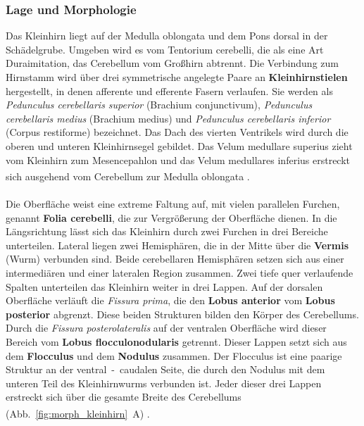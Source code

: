 \subsubsection{Lage und Morphologie}
Das Kleinhirn liegt auf der Medulla oblongata und dem Pons dorsal in der Schädelgrube. Umgeben wird es vom Tentorium cerebelli, die als eine Art Duraimitation, das Cerebellum vom Großhirn abtrennt. Die Verbindung zum Hirnstamm wird über drei symmetrische angelegte Paare an \textbf{Kleinhirnstielen}  hergestellt, in denen afferente und efferente Fasern verlaufen. Sie werden als \textit{Pedunculus cerebellaris superior} (Brachium conjunctivum), \textit{Pedunculus cerebellaris medius} (Brachium medius)  und \textit{Pedunculus cerebellaris inferior} (Corpus restiforme)  bezeichnet.  Das Dach des vierten Ventrikels wird durch die oberen und unteren Kleinhirnsegel  gebildet. Das Velum medullare superius zieht vom Kleinhirn zum Mesencepahlon und das Velum medullares inferius erstreckt sich ausgehend vom Cerebellum zur Medulla oblongata \textsuperscript{\cite[Kap.~7]{trepel2011neuroanatomie}}. \\
\\ \noindent Die Oberfläche weist eine extreme Faltung auf, mit vielen parallelen Furchen, genannt \textbf{Folia cerebelli}, die zur Vergrößerung der Oberfläche dienen. In die Längsrichtung lässt sich das Kleinhirn durch zwei Furchen in drei Bereiche unterteilen. Lateral liegen zwei Hemisphären, die in der Mitte über die \textbf{Vermis} (Wurm)  verbunden sind. Beide cerebellaren Hemisphären setzen sich aus einer intermediären und einer lateralen Region zusammen. Zwei tiefe quer verlaufende Spalten unterteilen das Kleinhirn weiter in drei Lappen. Auf der dorsalen Oberfläche verläuft die \textit{Fissura prima}, die den \textbf{Lobus anterior} vom \textbf{Lobus posterior} abgrenzt. Diese beiden Strukturen bilden den Körper des Cerebellums. Durch die \textit{Fissura posterolateralis} auf der ventralen Oberfläche wird dieser Bereich vom \textbf{Lobus flocculonodularis} getrennt. Dieser Lappen setzt sich aus dem \textbf{Flocculus}  und dem \textbf{Nodulus}  zusammen. Der Flocculus ist eine paarige Struktur an der ventral~-~caudalen Seite, die durch den Nodulus mit dem unteren Teil des Kleinhirnwurms verbunden ist. Jeder dieser drei Lappen erstreckt sich über die gesamte Breite des Cerebellums (Abb.~\ref{fig:morph_kleinhirn}~A) \textsuperscript{\cite[Kap.~42]{kandel2013principles}}. \\
